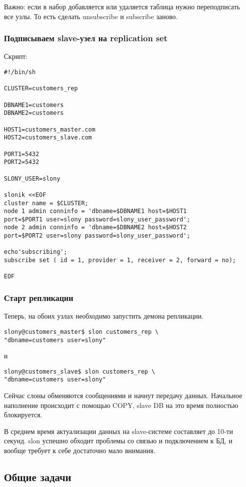 Важно: если в набор добавляется или удаляется таблица нужно переподписать все узлы. 
То есть сделать unsubscribe и subscribe заново. 

\subsubsection{Подписываем slave-узел на replication set}
Скрипт:
\begin{verbatim}
#!/bin/sh

CLUSTER=customers_rep

DBNAME1=customers
DBNAME2=customers

HOST1=customers_master.com
HOST2=customers_slave.com

PORT1=5432
PORT2=5432

SLONY_USER=slony

slonik <<EOF
cluster name = $CLUSTER;
node 1 admin conninfo = 'dbname=$DBNAME1 host=$HOST1 
port=$PORT1 user=slony password=slony_user_password';
node 2 admin conninfo = 'dbname=$DBNAME2 host=$HOST2 
port=$PORT2 user=slony password=slony_user_password';

echo'subscribing';
subscribe set ( id = 1, provider = 1, receiver = 2, forward = no);

EOF
\end{verbatim}

\subsubsection{Старт репликации}
Теперь, на обоих узлах необходимо запустить демона репликации.
\begin{verbatim}
slony@customers_master$ slon customers_rep \
"dbname=customers user=slony"
\end{verbatim}

и
\begin{verbatim}
slony@customers_slave$ slon customers_rep \
"dbname=customers user=slony"
\end{verbatim}

Сейчас слоны обменяются сообщениями и начнут передачу данных. Начальное наполнение происходит с помощью COPY, 
slave DB на это время полностью блокируется.

В среднем время актуализации данных на slave-системе составляет до 10-ти секунд. 
slon успешно обходит проблемы со связью и подключением к БД, и вообще требует к 
себе достаточно мало внимания. 

\subsection{Общие задачи}
